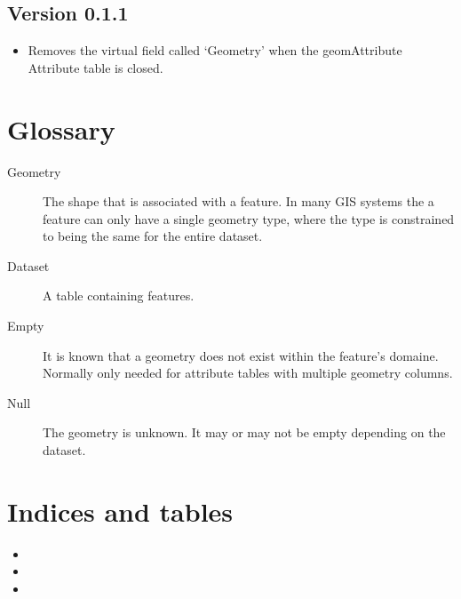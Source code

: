 \documentclass[letterpaper,11pt,english]{sphinxmanual}
\begin{document}
\section{Version 0.1.1}
\label{\detokenize{changelog:version-0-1-1}}\begin{itemize}
\item {} 
Removes the virtual field called ‘Geometry’ when the geomAttribute Attribute table is closed.

\end{itemize}


\chapter{Glossary}
\label{\detokenize{glossary:glossary}}\label{\detokenize{glossary::doc}}\begin{description}
\item[{Geometry}] \leavevmode
The shape that is associated with a feature.  In many GIS systems the a feature can only have a single geometry type,
where the type is constrained to being the same for the entire dataset.

\item[{Dataset}] \leavevmode
A table containing features.

\item[{Empty}] \leavevmode
It is known that a geometry does not exist within the feature’s domaine.  Normally only needed for attribute tables
with multiple geometry columns.

\item[{Null}] \leavevmode
The geometry is unknown.  It may or may not be empty depending on the dataset.

\end{description}


\chapter{Indices and tables}
\label{\detokenize{index:indices-and-tables}}\begin{itemize}
\item {} 

\item {} 

\item {} 

\end{itemize}
\end{document}
